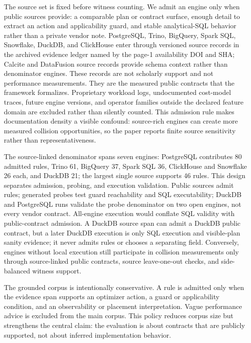 



The source set is fixed before witness counting.  We admit an engine only when public sources provide: a comparable plan or contract surface, enough detail to extract an action and applicability guard, and stable analytical-SQL behavior rather than a private vendor note.  PostgreSQL, Trino, BigQuery, Spark SQL, Snowflake, DuckDB, and ClickHouse enter through versioned source records in the archived evidence ledger named by the page-1 availability DOI and SHA; Calcite and DataFusion source records provide schema context rather than denominator engines.  These records are not scholarly support and not performance measurements.  They are the measured public contracts that the framework formalizes.  Proprietary workload logs, undocumented cost-model traces, future engine versions, and operator families outside the declared feature domain are excluded rather than silently counted.  This admission rule makes documentation density a visible confound: source-rich engines can create more measured collision opportunities, so the paper reports finite source sensitivity rather than representativeness.

The source-linked denominator spans seven engines: PostgreSQL contributes 80 admitted rules, Trino 61, BigQuery 37, Spark SQL 36, ClickHouse and Snowflake 26 each, and DuckDB 21; the largest single source supports 46 rules.  This design separates admission, probing, and execution validation.  Public sources admit rules; generated probes test guard reachability and SQL executability; DuckDB and PostgreSQL runs validate the probe denominator on two open engines, not every vendor contract.  All-engine execution would conflate SQL validity with public-contract admission.  A DuckDB source span can admit a DuckDB public contract, but a later DuckDB execution is only SQL execution and visible-plan sanity evidence; it never admits rules or chooses a separating field.  Conversely, engines without local execution still participate in collision measurements only through source-linked public contracts, source leave-one-out checks, and side-balanced witness support.

The grounded corpus is intentionally conservative.  A rule is admitted only when the evidence span supports an optimizer action, a guard or applicability condition, and an observability or placement interpretation.  Vague performance advice is excluded from the main corpus.  This policy reduces corpus size but strengthens the central claim: the evaluation is about contracts that are publicly supported, not about inferred implementation behavior.

